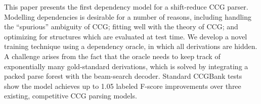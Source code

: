 This paper presents the first dependency model for a shift-reduce CCG parser. Modelling dependencies is desirable for a number of reasons, including handling the ``spurious'' ambiguity of CCG; fitting well with the theory of CCG; and optimizing for structures which are evaluated at test time. We develop a novel training technique using a dependency oracle, in which all derivations are hidden. A challenge arises from the fact that the oracle needs to keep track of exponentially many gold-standard derivations, which is solved by integrating a packed parse forest with the beam-search decoder. Standard CCGBank tests show the model achieves up to 1.05 labeled F-score improvements over three existing, competitive CCG parsing models.
